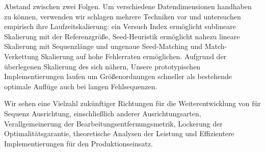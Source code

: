 Abstand zwischen zwei Folgen. Um verschiedene Datendimensionen handhaben zu
können, verwenden wir schlagen mehrere Techniken vor und untersuchen empirisch
ihre Laufzeitskalierung: ein Versuch Index ermöglicht sublineare Skalierung mit
der Referenzgröße, Seed-Heuristik ermöglicht nahezu lineare Skalierung mit
Sequenzlänge und ungenaue Seed-Matching und Match-Verkettung Skalierung auf hohe
Fehlerraten ermöglichen. Aufgrund der überlegenen Skalierung des \A sich nähern,
Unsere prototypischen Implementierungen laufen um Größenordnungen schneller als
bestehende optimale Anflüge auch bei langen Fehlsequenzen.

Wir sehen eine Vielzahl zukünftiger Richtungen für die Weiterentwicklung von \A
für Sequenz Ausrichtung, einschließlich anderer Ausrichtungsarten,
Verallgemeinerung der Bearbeitungsentfernungsmetrik, Lockerung der
Optimalitätsgarantie, theoretische Analysen der Leistung und Effizientere
Implementierungen für den Produktionseinsatz.

\endgroup
\vfill







